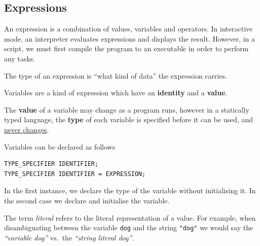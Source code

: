 \documentclass{article}
\begin{document}
\subsection{Expressions}
\begin{definition}[Expressions]
    An expression is a combination of values, variables and operators.
    In interactive mode, an interpreter evaluates expressions and displays the result.
    However, in a script, we must first compile the program to an executable in order
    to perform any tasks.
\end{definition}
\begin{definition}[Type]
    The type of an expression is ``what kind of data'' the expression carries.
\end{definition}
\begin{definition}[Variables]
    Variables are a kind of expression which have an \textbf{identity} and a \textbf{value}.

    The \textbf{value} of a variable may change as a program runs, however in
    a statically typed language, the \textbf{type} of each variable is
    specified before it can be used, and \underline{never changes}.

    Variables can be declared as follows
    \begin{lstlisting}
TYPE_SPECIFIER IDENTIFIER;
TYPE_SPECIFIER IDENTIFIER = EXPRESSION;
    \end{lstlisting}
    In the first instance, we declare the type of the variable without initialising it.
    In the second case we declare and initialise the variable.
\end{definition}
\begin{definition}[Literal]
    The term \textit{literal} refers to the literal representation of a value.
    For example, when disambiguating between the variable \lstinline!dog!
    and the string \lstinline!"dog"! we would say the \emph{``variable dog''} %
    vs.\ the \emph{``string literal dog''}.
\end{definition}
\end{document}
